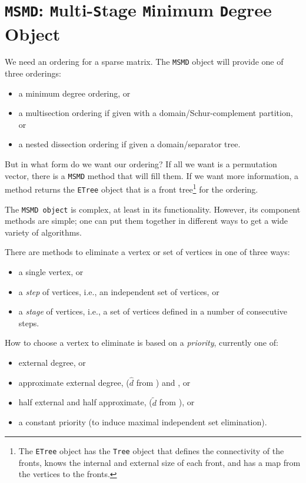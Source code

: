 \chapter{{\tt MSMD}: \break
        {\tt M}ulti-{\tt S}tage {\tt M}inimum {\tt D}egree Object}
\par
We need an ordering for a sparse matrix.
The {\tt MSMD} object will provide one of three orderings:
\begin{itemize}
\item
a minimum degree ordering, or
\item
a multisection ordering if given with a domain/Schur-complement 
partition, or 
\item
a nested dissection ordering if given a domain/separator tree.
\end{itemize}
\par
But in what form do we want our ordering?
If all we want is a permutation vector,
there is a {\tt MSMD} method that will fill them.
If we want more information, a method returns the {\tt ETree}
object that is a front tree\footnote{
The {\tt ETree} object has the {\tt Tree} object that defines the
connectivity of the fronts, knows the internal and external size of
each front, and has a map from the vertices to the fronts.
}
for the ordering.
\par
The {\tt MSMD object} is complex, at least in its functionality.
However, its component methods are simple; one can put them together 
in different ways to get a wide variety of algorithms.
\par
There are methods to eliminate a vertex or set of vertices in one
of three ways:
\begin{itemize}
\item
a single vertex, or
\item
a {\it step} of vertices, i.e., an independent set of vertices, or
\item
a {\it stage} of vertices, i.e., a set of vertices defined in 
a number of consecutive steps.
\end{itemize}
How to choose a vertex to eliminate is based on a {\it priority},
currently one of:
\begin{itemize}
\item
external degree, or
\item
approximate external degree, (${\hat d}$ from
\cite{ame96-amd}) and \cite{sparsematlab}, or
\item
half external and half approximate,
(${\tilde d}$ from \cite{ame96-amd}),
or
\item
a constant priority (to induce maximal independent set
elimination).
\end{itemize}
